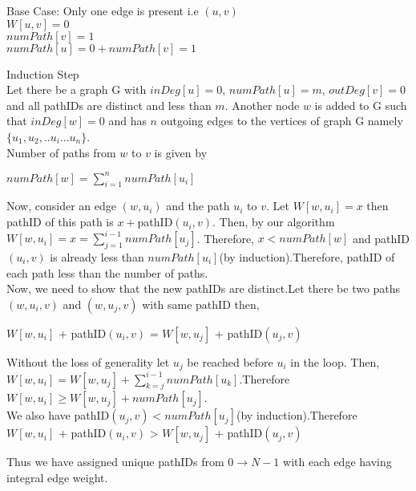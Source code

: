 \documentclass[a4paper,10pt]{article}
\begin{document}
\begin{description}
\item{Base Case:} Only one edge is present i.e $(u,v)$\\
$W[u,v] = 0$\\
$numPath[v] = 1$\\
$numPath[u] = 0 + numPath[v] = 1$\\
\item{Induction Step}\\
Let there be a graph G with $inDeg[u]=0$, $numPath[u]=m$, $outDeg[v]=0$ and all pathIDs are distinct and less than $m$.
Another node $w$ is added to G such that $inDeg[w]=0$ and has $n$ outgoing edges to the vertices of graph G namely $\{u_1,u_2,..u_i...u_n\}$.\\
Number of paths from $w$ to $v$ is given by \\\begin{center}$numPath[w] = \displaystyle\sum\limits_{i=1}^{n} numPath[u_i]$\end{center}
Now, consider an edge $(w,u_i)$ and the path $u_i$ to $v$. Let $W[w,u_i] = x$ then pathID of this path is $x + $pathID$(u_i,v)$. Then, by our algorithm $W[w,u_i] = x=\displaystyle\sum\limits_{j=1}^{i-1} numPath[u_j]$. Therefore, $x<numPath[w]$ and pathID$(u_i,v)$ is already less than $numPath[u_i]$(by induction).Therefore, pathID of each path less than the number of paths.\\
Now, we need to show that the new pathIDs are distinct.Let there be two paths $(w,u_i,v)$ and $(w,u_j,v)$ with same pathID then,\\
\begin{center}
$W[w,u_i]$ + pathID$(u_i,v)$ = $W[w,u_j]$ + pathID$(u_j,v)$\\
\end{center}
Without the loss of generality let $u_j$ be reached before $u_i$ in the loop. Then, \\$W[w,u_i]= W[w,u_j] + \displaystyle\sum\limits_{k=j}^{i-1} numPath[u_k]$.Therefore $W[w,u_i]\geq W[w,u_j]+numPath[u_j]$.\\We also have pathID$(u_j,v)<numPath[u_j]$(by induction).Therefore \\$W[w,u_i]$ + pathID$(u_i,v)$ > $W[w,u_j]$ + pathID$(u_j,v)$\\
\end{description}
Thus we have assigned unique pathIDs from $0\rightarrow N-1$ with each edge having integral edge weight.
\end{document}
